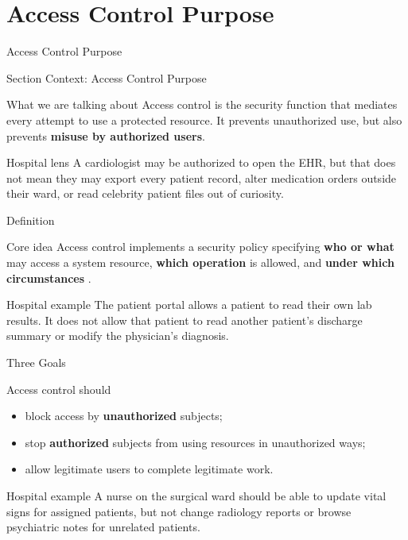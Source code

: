 \documentclass[presentation]{beamer}
\newcommand{\sectiontitleframe}[1]{
\begin{frame}[plain,c]
\begin{center}
{\usebeamerfont{title}\usebeamercolor[fg]{title}#1}
\end{center}
\end{frame}
}
\begin{document}
\section{Access Control Purpose}
\sectiontitleframe{Access Control Purpose}

\begin{frame}[c]{Section Context: Access Control Purpose}
\begin{block}{What we are talking about}
Access control is the security function that mediates every attempt to use a protected resource.
It prevents unauthorized use, but also prevents \textbf{misuse by authorized users}.
\end{block}

\begin{exampleblock}{Hospital lens}
A cardiologist may be authorized to open the EHR, but that does not mean they may export every
patient record, alter medication orders outside their ward, or read celebrity patient files out of
curiosity.
\end{exampleblock}
\end{frame}

\begin{frame}[c]{Definition}
\begin{block}{Core idea}
Access control implements a security policy specifying \textbf{who or what} may access a system
resource, \textbf{which operation} is allowed, and \textbf{under which circumstances}
\cite{rfc4949}.
\end{block}

\begin{exampleblock}{Hospital example}
The patient portal allows a patient to read their own lab results. It does not allow that patient to
read another patient's discharge summary or modify the physician's diagnosis.
\end{exampleblock}
\end{frame}

\begin{frame}[c]{Three Goals}
\begin{block}{Access control should}
\begin{itemize}
    \item block access by \textbf{unauthorized} subjects;
    \item stop \textbf{authorized} subjects from using resources in unauthorized ways;
    \item allow legitimate users to complete legitimate work.
\end{itemize}
\end{block}

\begin{exampleblock}{Hospital example}
A nurse on the surgical ward should be able to update vital signs for assigned patients, but not
change radiology reports or browse psychiatric notes for unrelated patients.
\end{exampleblock}
\end{frame}
\end{document}
